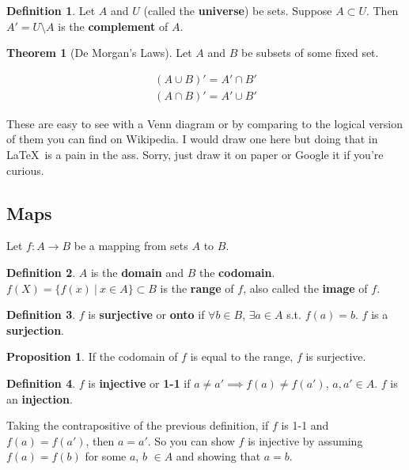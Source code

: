 \documentclass{article}
\theoremstyle{definition}
\newtheorem{definition}{Definition}[section]
\newtheorem{proposition}{Proposition}[section]
\newtheorem{theorem}{Theorem}[section]
\begin{document}
\begin{definition}
Let $A$ and $U$ (called the \textbf{universe}) be sets. Suppose $A \subset U$. Then $A' = U \setminus A$ is the \textbf{complement} of $A$.
\end{definition}

\begin{theorem}[De Morgan's Laws]
Let $A$ and $B$ be subsets of some fixed set.

\begin{align}
(A \cup B)' = A' \cap B' \\
(A \cap B)' = A' \cup B'
\end{align}
\end{theorem}

These are easy to see with a Venn diagram or by comparing to the logical version of them you can find on Wikipedia. I would draw one here but doing that in \LaTeX \ is a pain in the ass. Sorry, just draw it on paper or Google it if you're curious.

\subsection{Maps}

Let $f: A \rightarrow B$ be a mapping from sets $A$ to $B$.

\begin{definition}
$A$ is the \textbf{domain} and $B$ the \textbf{codomain}. $f(X) = \{f(x) \ | \ x \in A\} \subset B$ is the \textbf{range} of $f$, also called the \textbf{image} of $f$.
\end{definition}

\begin{definition}
$f$ is \textbf{surjective} or \textbf{onto} if $\forall b \in B$, $\exists a \in A$ s.t. $f(a) = b$. $f$ is a \textbf{surjection}.
\end{definition}

\begin{proposition}
If the codomain of $f$ is equal to the range, $f$ is surjective.
\end{proposition}

\begin{definition}
$f$ is \textbf{injective} or \textbf{1-1} if $a \neq a' \implies f(a) \neq f(a')$, $a, a' \in A$. $f$ is an \textbf{injection}.
\end{definition}

Taking the contrapositive of the previous definition, if $f$ is 1-1 and $f(a) = f(a')$, then $a = a'$. So you can show $f$ is injective by assuming $f(a) = f(b)$ for some $a$, $b$ $\in A$ and showing that $a = b$.
\end{document}

